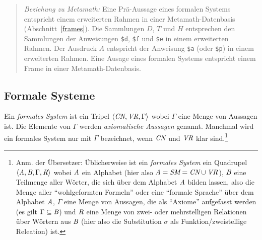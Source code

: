 {\footnotesize\begin{quotation}
{\em Beziehung zu Metamath:} Eine Prä-Aussage eines formalen Systems entspricht einem erweiterten Rahmen in einer Metamath-Datenbasis (Abschnitt~\ref{frames}).  Die Sammlungen $D$, $T$ und $H$ entsprechen den Sammlungen der Anweisungen \texttt{\$d}, \texttt{\$f} und \texttt{\$e} in einem erweiterten Rahmen.  Der Ausdruck $A$ entspricht der Anweisung \texttt{\$a} (oder \texttt{\$p}) in einem erweiterten Rahmen.  Eine Ausage eines formalen Systems entspricht einem Frame in einer Metamath-Datenbasis.
\end{quotation}}

\subsection{Formale Systeme}

Ein {\em formales System} ist ein Tripel $\langle \mbox{\em CN},\mbox{\em VR},\Gamma\rangle$ wobei $\Gamma$ eine Menge von Aussagen ist.  Die Elemente von $\Gamma$ werden {\em axiomatische Aussagen} genannt.  Manchmal wird ein formales System nur mit $\Gamma$ bezeichnet, wenn $\mbox{\em CN}$ und $\mbox{\em VR}$ klar sind.\footnote{Anm. der Übersetzer: Üblicherweise ist ein {\em formales System} ein Quadrupel $\langle \mbox{\em A},\mbox{\em B},\Gamma,\mbox{\em R}\rangle$
wobei $\mbox{\em A}$ ein Alphabet (hier also $\mbox{\em A} = \mbox{\em SM} = \mbox{\em CN}\cup \mbox{\em VR}$),
$\mbox{\em B}$ eine Teilmenge aller Wörter, die sich über dem Alphabet $\mbox{\em A}$ bilden lassen, also die Menge aller "`wohlgeformten Formeln"' oder eine "`formale Sprache"' über dem Alphabet $\mbox{\em A}$,
$\Gamma$ eine Menge von Aussagen, die als "`Axiome"' aufgefasst werden (es gilt $\Gamma\subseteq\mbox{\em B}$) und
$\mbox{\em R}$ eine Menge von zwei- oder mehrstelligen Relationen über Wörtern aus $\mbox{\em B}$ (hier also die Substitution $\sigma$ als Funktion/zweistellige Releation) ist.}

